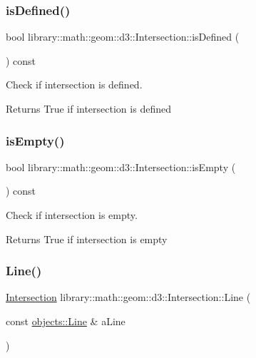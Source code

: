 \subsubsection{\texorpdfstring{is\+Defined()}{isDefined()}}
{\footnotesize\ttfamily bool library\+::math\+::geom\+::d3\+::\+Intersection\+::is\+Defined (\begin{DoxyParamCaption}{ }\end{DoxyParamCaption}) const}



Check if intersection is defined. 

\begin{DoxyReturn}{Returns}
True if intersection is defined 
\end{DoxyReturn}
\mbox{\label{classlibrary_1_1math_1_1geom_1_1d3_1_1_intersection_aad021013a517375d56e2110792ad7b07}} 
\subsubsection{\texorpdfstring{is\+Empty()}{isEmpty()}}
{\footnotesize\ttfamily bool library\+::math\+::geom\+::d3\+::\+Intersection\+::is\+Empty (\begin{DoxyParamCaption}{ }\end{DoxyParamCaption}) const}



Check if intersection is empty. 

\begin{DoxyReturn}{Returns}
True if intersection is empty 
\end{DoxyReturn}
\mbox{\label{classlibrary_1_1math_1_1geom_1_1d3_1_1_intersection_a3f099c46287b3dfb2e51c26b73fe0f8e}} 
\subsubsection{\texorpdfstring{Line()}{Line()}}
{\footnotesize\ttfamily \hyperlink{classlibrary_1_1math_1_1geom_1_1d3_1_1_intersection}{Intersection} library\+::math\+::geom\+::d3\+::\+Intersection\+::\+Line (\begin{DoxyParamCaption}\item[{const \hyperlink{classlibrary_1_1math_1_1geom_1_1d3_1_1objects_1_1_line}{objects\+::\+Line} \&}]{a\+Line }\end{DoxyParamCaption})\hspace{0.3cm}{\ttfamily [static]}}



